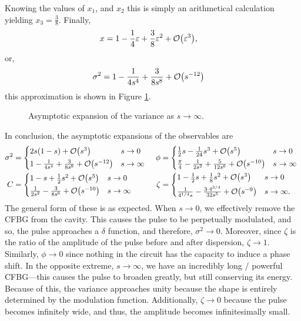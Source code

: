 Knowing the values of $x_1$, and $x_2$ this is simply an arithmetical calculation yielding $x_3 = \frac{3}{8}$. Finally,
\begin{align*}
x &= 1 - \frac{1}{4}\eps + \frac{3}{8}\eps^2 + \bigO{\eps^3},
\end{align*}
or,
\begin{align*}
\sigma^2 &= 1 - \frac{1}{4s^4} + \frac{3}{8s^8} + \bigO{s^{-12}}
\end{align*}
this approximation is shown in Figure \ref{fig:limsinfty}. \\
\begin{figure}[tbp]

\caption{Asymptotic expansion of the variance as $s \rightarrow \infty$.}
\label{fig:limsinfty}
\end{figure}

In conclusion, the asymptotic expansions of the observables are
\begin{align*}
\sigma^2 &=
\begin{cases*}
2s(1 - s) + \bigO{s^3} & $s \rightarrow 0$ \\
1 - \frac{1}{4s^4} + \frac{3}{8s^8} + \bigO{s^{-12}} & $s \rightarrow \infty$
\end{cases*}
& \phi &=
\begin{cases*}
\frac{1}{2}s - \frac{1}{24}s^3 + \bigO{s^5} & $s \rightarrow 0$ \\
\frac{\pi}{4} - \frac{1}{2s^2} + \frac{5}{12s^6} + \bigO{s^{-10}} & $s \rightarrow \infty$
\end{cases*} \\
C &=
\begin{cases*}
1 - s + \frac{1}{2}s^2 + \bigO{s^3} & $s \rightarrow 0$ \\
\frac{1}{2s^2} - \frac{3}{8s^6} + \bigO{s^{-10}} & $s \rightarrow \infty$
\end{cases*}
& \zeta &=
\begin{cases*}
1 - \frac{1}{2}s + \frac{1}{8}s^2 + \bigO{s^3} & $s \rightarrow 0$ \\
\frac{1}{4^{1/4}s} - \frac{3 \cdot 4^{3/4}}{32 s^5} + \bigO{s^{-9}} & $s \rightarrow \infty$.
\end{cases*}
\end{align*}
The general form of these is as expected. When $s \rightarrow 0$, we effectively remove the CFBG from the cavity. This causes the pulse to be perpetually modulated, and so, the pulse approaches a $\delta$ function, and therefore, $\sigma^2 \rightarrow 0$. Moreover, since $\zeta$ is the ratio of the amplitude of the pulse before and after dispersion, $\zeta \rightarrow 1$. Similarly, $\phi \rightarrow 0$ since nothing in the circuit has the capacity to induce a phase shift. In the opposite extreme, $s \rightarrow \infty$, we have an incredibly long / powerful CFBG---this causes the pulse to broaden greatly, but still conserving its energy. Because of this, the variance approaches unity because the shape is entirely determined by the modulation function. Additionally, $\zeta \rightarrow 0$ because the pulse becomes infinitely wide, and thus, the amplitude becomes infinitesimally small.







